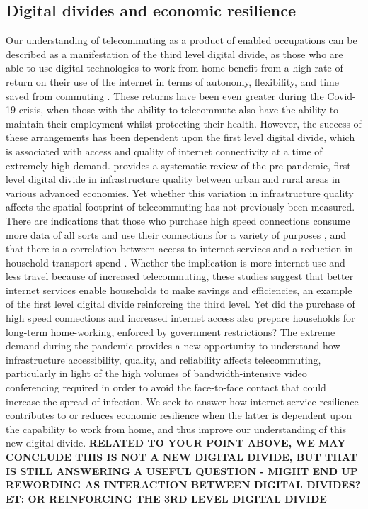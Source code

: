 \documentclass[]{interact}
\theoremstyle{plain}%
\theoremstyle{definition}
\theoremstyle{remark}
\begin{document}
\hypertarget{sec:2.2}{%
\subsection{Digital divides and economic resilience}\label{sec:2.2}}

Our understanding of telecommuting as a product of enabled occupations
can be described as a manifestation of the third level digital divide,
as those who are able to use digital technologies to work from home
benefit from a high rate of return on their use of the internet in terms
of autonomy, flexibility, and time saved from commuting
\citep{peters2004employees, siha2006telecommuting, singh2013modeling}.
These returns have been even greater during the Covid-19 crisis, when
those with the ability to telecommute also have the ability to maintain
their employment whilst protecting their health. However, the success of
these arrangements has been dependent upon the first level digital
divide, which is associated with access and quality of internet
connectivity at a time of extremely high demand. \citet{SALEMINK2017360}
provides a systematic review of the pre-pandemic, first level digital
divide in infrastructure quality between urban and rural areas in
various advanced economies. Yet whether this variation in infrastructure
quality affects the spatial footprint of telecommuting has not
previously been measured. There are indications that those who purchase
high speed connections consume more data of all sorts and use their
connections for a variety of purposes \citep{hauge2011consumer}, and
that there is a correlation between access to internet services and a
reduction in household transport spend \citep{bris2017ict}. Whether the
implication is more internet use and less travel because of increased
telecommuting, these studies suggest that better internet services
enable households to make savings and efficiencies, an example of the
first level digital divide reinforcing the third level. Yet did the
purchase of high speed connections and increased internet access also
prepare households for long-term home-working, enforced by government
restrictions? The extreme demand during the pandemic provides a new
opportunity to understand how infrastructure accessibility, quality, and
reliability affects telecommuting, particularly in light of the high
volumes of bandwidth-intensive video conferencing required in order to
avoid the face-to-face contact that could increase the spread of
infection. We seek to answer how internet service resilience contributes
to or reduces economic resilience when the latter is dependent upon the
capability to work from home, and thus improve our understanding of this
new digital divide. \textbf{RELATED TO YOUR POINT ABOVE, WE MAY CONCLUDE
THIS IS NOT A NEW DIGITAL DIVIDE, BUT THAT IS STILL ANSWERING A USEFUL
QUESTION - MIGHT END UP REWORDING AS INTERACTION BETWEEN DIGITAL
DIVIDES? ET: OR REINFORCING THE 3RD LEVEL DIGITAL DIVIDE}
\end{document}

